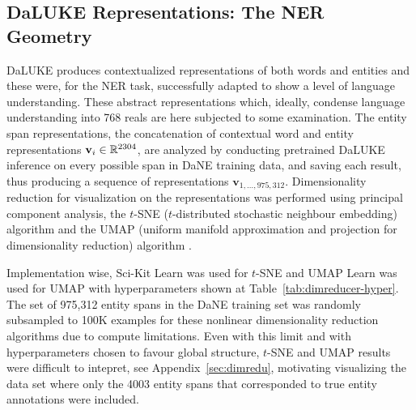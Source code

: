 \documentclass[main.tex]{subfiles}
\begin{document}
\subsection{DaLUKE Representations: The NER Geometry}
DaLUKE produces contextualized representations of both words and entities and these were, for the NER task, successfully adapted to show a level of language understanding.
These abstract representations which, ideally, condense language understanding into 768 reals are here subjected to some examination.
The entity span representations, the concatenation of contextual word and entity representations $\mathbf v_i \in \mathbb R^{2304}$, are analyzed by conducting pretrained DaLUKE inference on every possible span in DaNE training data, and saving each result, thus producing a sequence of representations $\mathbf v_{1, \ldots, 975,312}$.
Dimensionality reduction for visualization on the representations was performed using principal component analysis, the $t$-SNE ($t$-distributed stochastic neighbour embedding) algorithm \cite{maaten2008tsne} and the UMAP (uniform manifold approximation and projection for dimensionality reduction) algorithm \cite{mcinnes2020umap}.

Implementation wise, Sci-Kit Learn was used for $t$-SNE \cite{pedregosa2011scikit} and UMAP Learn was used for UMAP \cite{mcinnes2018umap-software} with hyperparameters shown at Table~\ref{tab:dimreducer-hyper}.
The set of 975,312 entity spans in the DaNE training set was randomly subsampled to 100K examples for these nonlinear dimensionality reduction algorithms due to compute limitations.
Even with this limit and with hyperparameters chosen to favour global structure, $t$-SNE and UMAP results were difficult to intepret, see Appendix~\ref{sec:dimredu}, motivating visualizing the data set where only the 4003 entity spans that corresponded to true entity annotations were included.
\end{document}
